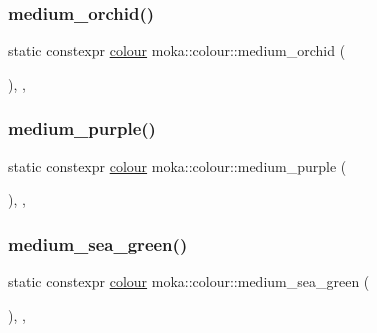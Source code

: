 \mbox{\label{classmoka_1_1colour_af005c75898bb6fe21cef0b7a6b98da52}} 
\subsubsection{\texorpdfstring{medium\_orchid()}{medium\_orchid()}}
{\footnotesize\ttfamily static constexpr \mbox{\hyperlink{classmoka_1_1colour}{colour}} moka\+::colour\+::medium\+\_\+orchid (\begin{DoxyParamCaption}{ }\end{DoxyParamCaption})\hspace{0.3cm}{\ttfamily [inline]}, {\ttfamily [static]}, {\ttfamily [noexcept]}}

\mbox{\label{classmoka_1_1colour_a789925f497faf5d74422cb82697cbf2a}} 
\subsubsection{\texorpdfstring{medium\_purple()}{medium\_purple()}}
{\footnotesize\ttfamily static constexpr \mbox{\hyperlink{classmoka_1_1colour}{colour}} moka\+::colour\+::medium\+\_\+purple (\begin{DoxyParamCaption}{ }\end{DoxyParamCaption})\hspace{0.3cm}{\ttfamily [inline]}, {\ttfamily [static]}, {\ttfamily [noexcept]}}

\mbox{\label{classmoka_1_1colour_ad8ddb747e935e376dac4584546b465c3}} 
\subsubsection{\texorpdfstring{medium\_sea\_green()}{medium\_sea\_green()}}
{\footnotesize\ttfamily static constexpr \mbox{\hyperlink{classmoka_1_1colour}{colour}} moka\+::colour\+::medium\+\_\+sea\+\_\+green (\begin{DoxyParamCaption}{ }\end{DoxyParamCaption})\hspace{0.3cm}{\ttfamily [inline]}, {\ttfamily [static]}, {\ttfamily [noexcept]}}

